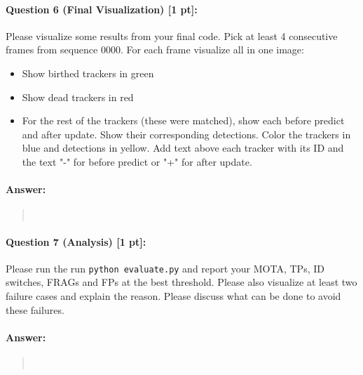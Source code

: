 \documentclass[11pt]{article}
\begin{document}
\paragraph{Question 6 (Final Visualization) [1 pt]:}
Please visualize some results from your final code. 
Pick at least 4 consecutive frames from sequence 0000. For each frame visualize all in one image:
\begin{itemize}
    \item Show birthed trackers in green
    \item Show dead trackers in red
    \item For the rest of the trackers (these were matched), show each before predict and after update. Show their corresponding detections. Color the trackers in blue and detections in yellow. Add text above each tracker with its ID and the text "-" for before predict or "+" for after update.  
\end{itemize}
\paragraph{Answer:} 
\begin{quote}



\begin{lstlisting}[language=Python, basicstyle=\scriptsize]



\end{lstlisting}



\end{quote}


\paragraph{Question 7 (Analysis) [1 pt]:}
Please run the run \texttt{python evaluate.py} and report your MOTA, TPs, ID switches, FRAGs and FPs at the best threshold. Please also visualize at least two failure cases and explain the reason. Please discuss what can be done to avoid these failures.  
\paragraph{Answer:} 
\begin{quote}



\begin{lstlisting}[language=Python, basicstyle=\scriptsize]



\end{lstlisting}



\end{quote}
\end{document}
